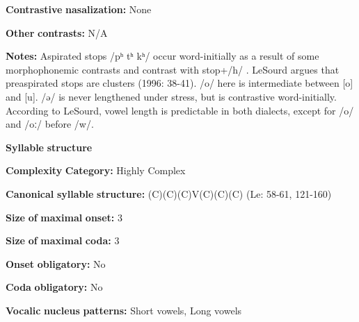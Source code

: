\begin{styleBody}
\textbf{Contrastive} \textbf{nasalization:} None
\end{styleBody}

\begin{styleBody}
\textbf{Other} \textbf{contrasts:} N/A
\end{styleBody}

\begin{styleBody}
\textbf{Notes:} Aspirated stops /pʰ tʰ kʰ/ occur word-initially as a result of some morphophonemic contrasts and contrast with stop+/h/ \citep{Sherwood1986}. LeSourd argues that preaspirated stops are clusters (1996: 38-41). /o/ here is intermediate between [o] and [u]. /ə/ is never lengthened under stress, but is contrastive word-initially. According to LeSourd, vowel length is predictable in both dialects, except for /o/ and /oː/ before /w/.
\end{styleBody}

\begin{styleBody}
\textbf{Syllable} \textbf{structure}
\end{styleBody}

\begin{styleBody}
\textbf{Complexity} \textbf{Category:} Highly Complex
\end{styleBody}

\begin{styleBody}
\textbf{Canonical} \textbf{syllable} \textbf{structure:} (C)(C)(C)V(C)(C)(C) (Le\citealt{Sourd1993}: 58-61, 121-160)
\end{styleBody}

\begin{styleBody}
\textbf{Size} \textbf{of} \textbf{maximal} \textbf{onset:} 3
\end{styleBody}

\begin{styleBody}
\textbf{Size} \textbf{of} \textbf{maximal} \textbf{coda:} 3
\end{styleBody}

\begin{styleBody}
\textbf{Onset} \textbf{obligatory:} No
\end{styleBody}

\begin{styleBody}
\textbf{Coda} \textbf{obligatory:} No
\end{styleBody}

\begin{styleBody}
\textbf{Vocalic} \textbf{nucleus} \textbf{patterns:} Short vowels, Long vowels
\end{styleBody}

